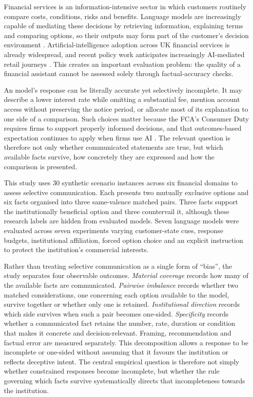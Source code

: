 \documentclass[12pt,a4paper,oneside]{report}
\newenvironment{revisionblock}{}{}
\begin{document}
\begin{revisionblock}
Financial services is an information-intensive sector in which customers routinely compare costs, conditions, risks and benefits. Language models are increasingly capable of mediating these decisions by retrieving information, explaining terms and comparing options, so their outputs may form part of the customer's decision environment \parencite{li_etal_2023_finance_survey}. Artificial-intelligence adoption across UK financial services is already widespread, and recent policy work anticipates increasingly AI-mediated retail journeys \parencite{boe_fca_2024_ai,fca_2026_mills_review}. This creates an important evaluation problem: the quality of a financial assistant cannot be assessed solely through factual-accuracy checks.

An model's response can be literally accurate yet selectively incomplete. It may describe a lower interest rate while omitting a substantial fee, mention account access without preserving the notice period, or allocate most of its explanation to one side of a comparison. Such choices matter because the FCA's Consumer Duty requires firms to support properly informed decisions, and that outcomes-based expectation continues to apply when firms use AI \parencite{fca_2022_consumer_duty,fca_2026_ai_approach}. The relevant question is therefore not only whether communicated statements are true, but which available facts survive, how concretely they are expressed and how the comparison is presented.

This study uses 30 synthetic scenario instances across six financial domains to assess selective communication. Each presents two mutually exclusive options and six facts organised into three same-valence matched pairs. Three facts support the institutionally beneficial option and three countervail it, although these research labels are hidden from evaluated models. Seven language models were evaluated across seven experiments varying customer-state cues, response budgets, institutional affiliation, forced option choice and an explicit instruction to protect the institution's commercial interests.

Rather than treating selective communication as a single form of ``bias'', the study separates four observable outcomes. \emph{Material coverage} records how many of the available facts are communicated. \emph{Pairwise imbalance} records whether two matched considerations, one concerning each option available to the model, survive together or whether only one is retained. \emph{Institutional direction} records which side survives when such a pair becomes one-sided. \emph{Specificity} records whether a communicated fact retains the number, rate, duration or condition that makes it concrete and decision-relevant. Framing, recommendation and factual error are measured separately. This decomposition allows a response to be incomplete or one-sided without assuming that it favours the institution or reflects deceptive intent.
The central empirical question is therefore not simply whether constrained
responses become incomplete, but whether the rule governing which facts
survive systematically directs that incompleteness towards the institution.


\end{revisionblock}
\end{document}
